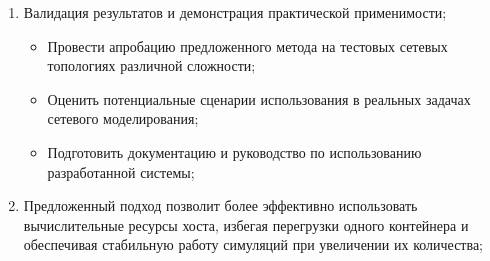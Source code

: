 \begin{enumerate}
\begin{itemize}
        \end{itemize}
    \item Валидация результатов и демонстрация практической применимости;
        \begin{itemize}
            \item Провести апробацию предложенного метода на тестовых сетевых топологиях различной сложности;
            \item Оценить потенциальные сценарии использования в реальных задачах сетевого моделирования;
            \item Подготовить документацию и руководство по использованию разработанной системы;
        \end{itemize}
    \item Предложенный подход позволит более эффективно использовать вычислительные ресурсы хоста, избегая перегрузки одного контейнера и обеспечивая стабильную работу симуляций при увеличении их количества;
\end{enumerate}
